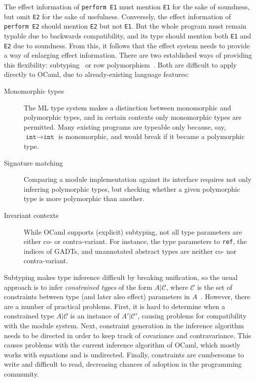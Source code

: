 \documentclass[a4paper,UKenglish]{dagrep}
\begin{document}
\noindent The effect information of \verb|perform E1|
must mention \verb|E1| for the sake of soundness, but omit \verb|E2| for the sake of usefulness. Conversely, the effect information of \verb|perform E2|
should mention \verb|E2| but not \verb|E1|. But the whole program must remain typable due to backwards compatibility, and its type should mention both \verb|E1| and \verb|E2| due to soundness.
From this, it follows that the effect system needs to provide a way of enlarging effect information.
There are two established ways of providing this flexibility: subtyping~\cite{DBLP:conf/popl/WansbroughJ99} or row polymorphism~\cite{DBLP:journals/corr/Leijen14}. Both are difficult to apply directly to OCaml, due to already-existing language features:
%
\begin{description}
\item[Monomorphic types] The ML type system makes a distinction between monomorphic and polymorphic types, and in certain contexts only monomorphic types are permitted. Many existing programs are typeable only because, say, $\texttt{int} \to \texttt{int}$ is monomorphic, and would break if it became a polymorphic type.
\item[Signature matching] Comparing a module implementation against its interface requires not only inferring polymorphic types, but checking whether a given polymorphic type is more polymorphic than another.
\item[Invariant contexts] While OCaml supports (explicit) subtyping, not all type parameters are either co- or contra-variant. For instance, the type parameters to {\tt ref}, the indices of GADTs, and unannotated abstract types are neither co- nor contra-variant.
\end{description}

Subtyping makes type inference difficult by breaking unification, so the usual approach is to infer \emph{constrained types} of the form $A | \mathcal{C}$, where $\mathcal{C}$ is the set of constraints between type (and later also effect) parameters in $A$~\cite{pottier-thesis}. However, there are a number of practical problems. First, it is hard to determine when a constrained type $A | \mathcal{C}$ is an instance of $A' | \mathcal{C}'$, causing problems for compatibility with the module system. Next, constraint generation in the inference algorithm needs to be directed in order to keep track of covariance and contravariance. This causes problems with the current inference algorithm of OCaml, which mostly works with equations and is undirected. Finally, constraints are cumbersome to write and difficult to read, decreasing chances of adoption in the programming community.
\end{document}
